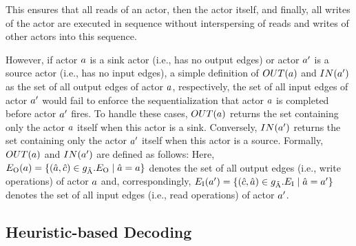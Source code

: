 This ensures that all reads of an actor, then the actor itself, and finally, all writes of the actor are executed in sequence without interspersing of reads and writes of other actors into this sequence.
\par
However, if actor $a$ is a sink actor (i.e., has no output edges) or actor $a'$ is a source actor (i.e., has no input edges), a simple definition of $OUT(a)$ and $IN(a')$ as the set of all output edges of actor $a$, respectively, the set of all input edges of actor $a'$ would fail to enforce the sequentialization that actor $a$ is completed before actor $a'$ fires.
To handle these cases, $OUT(a)$ returns the set containing only the actor $a$ itself when this actor is a sink.
Conversely, $IN(a')$ returns the set containing only the actor $a'$ itself when this actor is a source.
Formally, $OUT(a)$ and $IN(a')$ are defined as follows:
Here, $E_\textrm{O}(a) = \{ (\hat{a}, \hat{c}) \in g_{\tilde{\textrm{A}}}.E_\textrm{O} \mid \hat{a} = a \}$ denotes the set of all output edges (i.e., write operations) of actor $a$ and, correspondingly, $E_\textrm{I}(a') = \{ (\hat{c}, \hat{a}) \in g_{\tilde{\textrm{A}}}.E_\textrm{I} \mid \hat{a} = a' \}$ denotes the set of all input edges (i.e., read operations) of actor $a'$.

\subsection{Heuristic-based Decoding}\label{sec:heuristic}

